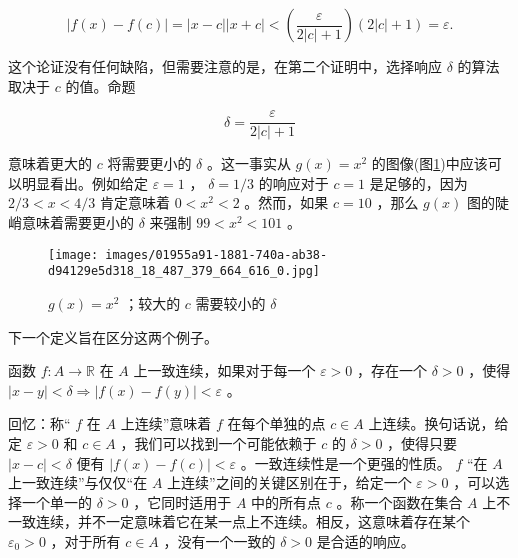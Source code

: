 \begin{Eg}
\begin{enumerate}[label = (\roman*)]
\[
\left| {f\left( x\right)  - f\left( c\right) }\right|  = \left| {x - c}\right| \left| {x + c}\right|  < \left( \frac{\varepsilon }{2\left| c\right|  + 1}\right) \left( {2\left| c\right|  + 1}\right)  = \varepsilon .
\]

这个论证没有任何缺陷，但需要注意的是，在第二个证明中，选择响应 \(\delta\) 的算法取决于 \(c\) 的值。命题

\[
\delta  = \frac{\varepsilon }{2\left| c\right|  + 1}
\]

意味着更大的 \(c\) 将需要更小的 \(\delta\) 。这一事实从 \(g\left( x\right)  = {x}^{2}\) 的图像(图\ref{fig:4.7})中应该可以明显看出。例如给定 \(\varepsilon  = 1\) ， \(\delta  = 1/3\) 的响应对于 \(c = 1\) 是足够的，因为 \(2/3 < x < 4/3\) 肯定意味着 \(0 < {x}^{2} < 2\) 。然而，如果 \(c = {10}\) ，那么 \(g\left( x\right)\) 图的陡峭意味着需要更小的 \(\delta\) 来强制 \({99} < {x}^{2} < {101}\) 。

\begin{figure}[h]
  \centering
  \texttt{[image: images/01955a91-1881-740a-ab38-d94129e5d318\_18\_487\_379\_664\_616\_0.jpg]}
  \caption{ \(g\left( x\right)  = {x}^{2}\) ；较大的 \(c\) 需要较小的 \(\delta\) }
  \label{fig:4.7}
\end{figure}

  \end{enumerate}
\end{Eg}

下一个定义旨在区分这两个例子。

\begin{Def}
  \label{def:4.4.5}
   函数 \(f : A \rightarrow  \mathbb{R}\) 在 \(A\) 上一致连续，如果对于每一个 \(\varepsilon  > 0\) ，存在一个 \(\delta  > 0\) ，使得 \(\left| {x - y}\right|  < \delta\Rightarrow \left| {f\left( x\right)  - f\left( y\right) }\right|  < \varepsilon\) 。
\end{Def}


回忆：称“ \(f\) 在 \(A\) 上连续”意味着 \(f\) 在每个单独的点 \(c \in  A\) 上连续。换句话说，给定 \(\varepsilon  > 0\) 和 \(c \in  A\) ，我们可以找到一个可能依赖于 \(c\) 的 \(\delta  > 0\) ，使得只要 \(\left| {x - c}\right|  < \delta\) 便有 \(\left| {f\left( x\right)  - f\left( c\right) }\right|  < \varepsilon\) 。一致连续性是一个更强的性质。 \(f\) “在 \(A\) 上一致连续”与仅仅“在 \(A\) 上连续”之间的关键区别在于，给定一个 \(\varepsilon  > 0\) ，可以选择一个单一的 \(\delta  > 0\) ，它同时适用于 \(A\) 中的所有点 \(c\) 。称一个函数在集合 \(A\) 上不一致连续，并不一定意味着它在某一点上不连续。相反，这意味着存在某个 \({\varepsilon }_{0} > 0\) ，对于所有 \(c \in  A\) ，没有一个一致的 \(\delta  > 0\) 是合适的响应。

